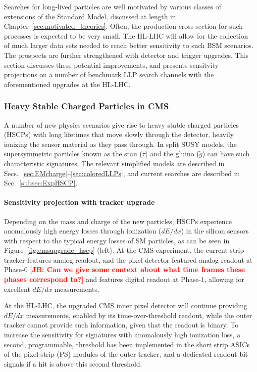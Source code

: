 Searches for long-lived particles are well motivated by various classes of extensions of the Standard Model, discussed at length in Chapter~\ref{sec:motivated_theories}. Often, the production cross section for such processes is expected to be very small. The HL-LHC will allow for the collection of much larger data sets needed to reach better sensitivity to such BSM scenarios. The prospects are further strengthened with detector and trigger upgrades. This section discusses these potential improvements, and presents sensitvity projections on a number of benchmark LLP search channels with the aforementioned upgrades at the HL-LHC.

\subsubsection{Heavy Stable Charged Particles in CMS}

A number of new physics scenarios give rise to heavy stable charged particles (HSCPs) with long lifetimes that move slowly through the detector, heavily ionizing the sensor material as they pass through. In split SUSY models, the supersymmetric particles known as the stau ($\tilde{\tau}$) and the gluino ($\tilde{g}$) can have such characteristic signatures. The relevant simplified models are described in Secs.~\ref{sec:EMcharge}--\ref{sec:coloredLLPs}, and current searches are described in Sec.~\ref{subsec:ExpHSCP}.

\paragraph{Sensitivity projection with tracker upgrade} 

Depending on the mass and charge of the new particles, HSCPs experience anomalously high energy losses through ionization ($dE/dx$) in the silicon sensors with respect to the typical energy losses of SM particles, as can be seen in Figure~\ref{fig:cmsupgrade_hscp} (left). At the CMS experiment, the current strip tracker features analog readout, and the pixel detector featured analog readout at Phase-0 {\bf \textcolor{red}{[JB: Can we give some context about what time frames these phases correspond to?]}} and features digital readout at Phase-1, allowing for excellent $dE/dx$ measurements.

At the HL-LHC, the upgraded CMS inner pixel detector will continue providing $dE/dx$ measurements, enabled by its time-over-threshold readout, while the outer tracker cannot provide such information, given that the readout is binary. To increase the sensitivity for signatures with anomalously high ionization loss, a second, programmable, threshold has been implemented in the short strip ASICs of the pixel-strip (PS) modules of the outer tracker, and a dedicated readout bit signals if a hit is above this second threshold.  

